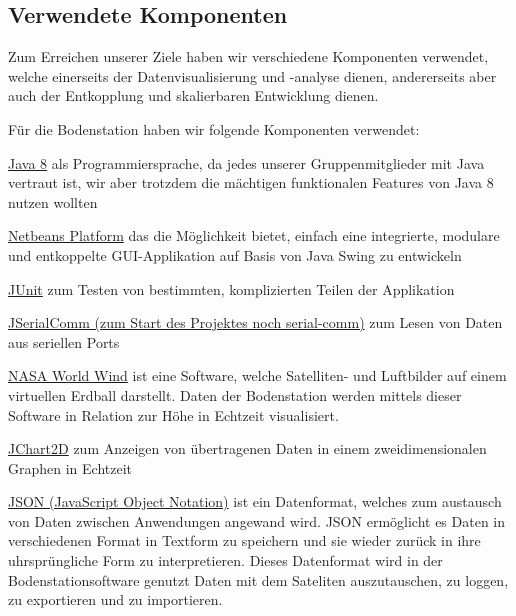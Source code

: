 \subsection{Verwendete Komponenten}
Zum Erreichen unserer Ziele haben wir verschiedene Komponenten verwendet, welche einerseits der Datenvisualisierung und -analyse dienen, andererseits aber auch der Entkopplung und skalierbaren Entwicklung dienen.

Für die Bodenstation haben wir folgende Komponenten verwendet:
\begin{description}
	\item \href {http://www.oracle.com/technetwork/java/javase/downloads/jdk8-downloads-2133151.html}{Java 8} als Programmiersprache, da jedes unserer Gruppenmitglieder mit Java vertraut ist, wir aber trotzdem die mächtigen funktionalen Features von Java 8 nutzen wollten
	\item \href {https://netbeans.org/features/platform/}{Netbeans Platform} das die Möglichkeit bietet, einfach eine integrierte, modulare und entkoppelte GUI-Applikation auf Basis von Java Swing zu entwickeln
	\item \href {http://junit.org/}{JUnit} zum Testen von bestimmten, komplizierten Teilen der Applikation
	\item \href {http://fazecast.github.io/jSerialComm/}{JSerialComm (zum Start des Projektes noch serial-comm)} zum Lesen von Daten aus seriellen Ports
	\item \href {http://worldwind.arc.nasa.gov/java/}{NASA World Wind} ist eine Software, welche Satelliten- und Luftbilder auf einem virtuellen Erdball darstellt. Daten der Bodenstation werden mittels dieser Software in Relation zur Höhe in Echtzeit visualisiert.
	\item \href {http://jchart2d.sourceforge.net/}{JChart2D} zum Anzeigen von übertragenen Daten in einem zweidimensionalen Graphen in Echtzeit 
	\item \href{http://www.json.org/}{JSON (JavaScript Object Notation)} ist ein Datenformat, welches zum austausch von Daten zwischen Anwendungen angewand wird. JSON ermöglicht es Daten in verschiedenen Format in Textform zu speichern und sie wieder zurück in ihre uhrsprüngliche Form zu interpretieren. Dieses Datenformat wird in der Bodenstationsoftware genutzt Daten mit dem Sateliten auszutauschen, zu loggen, zu exportieren und zu importieren.
\end{description}